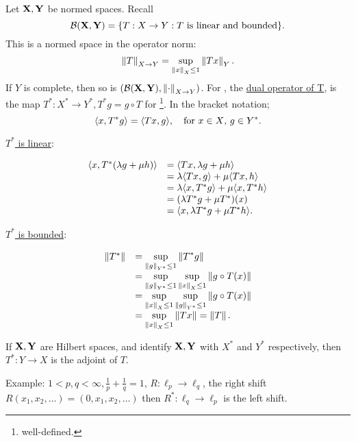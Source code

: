 \documentclass{article}
\begin{document}
Let $\mathbf{X,Y}$ be normed spaces. Recall 
$$
\mathcal{B}(\mathbf{X,Y})=\{T:X\to Y: T \text{ is linear and bounded}\}.
$$
This is a normed space in the operator norm: $$\left\lVert T\right\rVert_{X\to Y}=\displaystyle\sup_{\left\lVert x\right\rVert_X\leq 1 }\left\lVert Tx\right\rVert_Y.
$$
If $Y$ is complete, then so is $(\mathcal{B}(\mathbf{X,Y}), \left\lVert\cdot\right\rVert_{X\to Y})$. For , the \noindent\underline{dual operator of T}, is the map $T^*:X^*\to Y^*, T^*g = g\circ T$ for \footnote{well-defined.}. In the bracket notation; 
$$
\langle x, T^*g\rangle=\langle Tx, g\rangle, \quad \text{for } \text{$x\in X$, $g\in Y^*$}.
$$

\noindent\underline{$T^*$ is linear}: 

$$
\begin{array}{ll}
     \langle x, T^*(\lambda g+\mu h)\rangle
     &=\langle Tx, \lambda g+\mu h\rangle\\
     &= \lambda\langle Tx, g\rangle+\mu\langle Tx, h\rangle\\
     &=\lambda\langle x, T^*g\rangle+\mu\langle x, T^*h\rangle\\
     &=(\lambda T^* g+\mu T^* )(x)\\
     &=\langle x, \lambda T^* g+\mu T^* h\rangle.
\end{array}
$$

\noindent\underline{$T^*$ is bounded}: 

$$
\begin{array}{ll}
    \left\lVert T^*\right\rVert
    &=\displaystyle \sup_{\left\lVert g\right\rVert_{Y^*}\leq 1}\left\lVert T^*g\right\rVert\\
    &=\displaystyle\sup_{\left\lVert g\right\rVert_{Y^*}\leq 1}\sup_{\left\lVert x\right\rVert_{X}\leq 1}\left\lVert g\circ T(x)\right\rVert\\
    &= \displaystyle\sup_{\left\lVert x\right\rVert_{X}\leq 1}\sup_{\left\lVert g\right\rVert_{Y^*}\leq 1}\left\lVert g\circ T(x)\right\rVert\\
    &= \displaystyle\sup_{\left\lVert x\right\rVert_{X}\leq 1}\left\lVert Tx\right\rVert=\left\lVert T\right\rVert.
\end{array}
$$

\begin{remark}
    If $\mathbf{X,Y}$ are Hilbert spaces, and identify $\mathbf{X,Y}$ with $X^*$ and $Y^*$ respectively, then $T^*:Y\to X$ is the adjoint of $T$.
\end{remark}

\begin{examplesblock}{Example:}\label{examples: 3}
   $1<p,q<\infty, \frac{1}{p} +\frac{1}{q}=1$, $R:\ell_p\to\ell_q$, the right shift $R(x_1, x_2,\dots)= (0,x_1, x_2,\dots)$ then $R^*:\ell_q\to \ell_p$ is the left shift.
\end{examplesblock}
\end{document}
